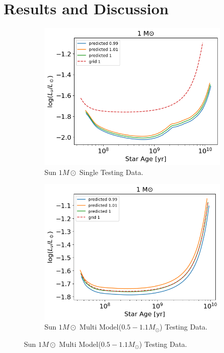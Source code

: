 \section{Results and Discussion}

\begin{figure}[H]
	\centering
	\begin{subfigure}{\textwidth}
		\includegraphics[width=\textwidth,height=0.5\textheight]{assets/output1singlemodel.png}
		\caption{Sun $1M\odot$ Single Testing Data.}
		\label{fig:SunTesta}	
	\end{subfigure}
	\begin{subfigure}{\textwidth}
		\includegraphics[width=\textwidth,height=0.5\textheight]{assets/output1.png}
		\caption{Sun $1M\odot$ Multi Model($0.5-1.1M_\odot$) Testing Data.}
		\label{fig:SunTestb}	
	\end{subfigure}
	\label{fig:SunTest}
\end{figure}

